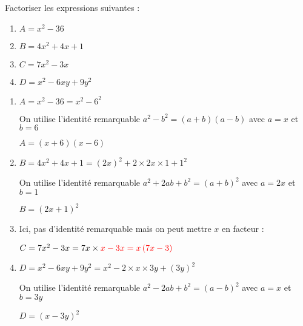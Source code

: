 
Factoriser les expressions suivantes :
\begin{enumerate}
     \item
     $A=x^{2}-36$
     \item
     $B=4x^{2}+4x+1$
     \item
     $C=7x^{2}-3x$
     \item
     $D=x^{2}-6xy+9y^{2}$
\end{enumerate}
\begin{corrige}
     \begin{enumerate}
          \item
          $A=x^{2}-36=x^{2}-6^{2}$
          \par
          On utilise l'identité remarquable $a^{2}-b^{2}=\left(a+b\right)\left(a-b\right)$ avec $a=x$ et $b=6$
          \par
          $A=\left(x+6\right)\left(x-6\right)$
          \item
          $B=4x^{2}+4x+1=\left(2x\right)^{2}+2\times 2x\times 1+1^{2}$
          \par
          On utilise l'identité remarquable $a^{2}+2ab+b^{2}=\left(a+b\right)^{2}$ avec $a=2x$ et $b=1$
          \par
          $B=\left(2x+1\right)^{2}$
          \item
          Ici, pas d'identité remarquable mais on peut mettre $x$ en facteur :
          \par
          $C=7x^{2}-3x=7x\times \color{red}{x}-3\color{red}{x}=x\left(7x-3\right)$
          \item
          $D=x^{2}-6xy+9y^{2}=x^{2}-2\times x\times 3y+\left(3y\right)^{2}$
          \par
          On utilise l'identité remarquable $a^{2}-2ab+b^{2}=\left(a-b\right)^{2}$ avec $a=x$ et $b=3y$
          \par
          $D=\left(x-3y\right)^{2}$
     \end{enumerate}
\end{corrige}


